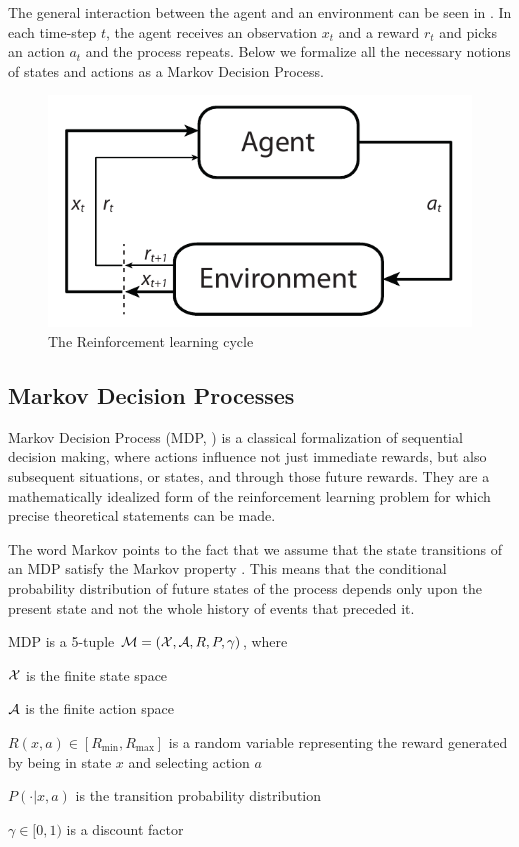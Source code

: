 The general interaction between the agent and an environment can be seen in . In each time-step $t$, the agent receives an observation $x_t$ and a reward $r_t$ and picks an action $a_t$ and the process repeats. Below we formalize all the necessary notions of states and actions as a Markov Decision Process.

\begin{figure}[h]
\center
\includegraphics[width=.6\linewidth]{gfx/rl_loop.pdf}
\caption{The Reinforcement learning cycle}
\label{fig:prelim:rlloop}
\end{figure}

\subsection{Markov Decision Processes}

Markov Decision Process (MDP, \citet{bellman1957markovian}) is a classical formalization of sequential decision making, where actions influence not just immediate rewards, but also subsequent situations, or states, and through those future rewards. They are a mathematically idealized form of the reinforcement learning problem for which precise theoretical statements can be made.

The word Markov points to the fact that we assume that the state transitions of an MDP satisfy the Markov property \cite{???}. This means that the conditional probability distribution of future states of the process depends only upon the present state and not the whole history of events that preceded it.

\begin{definition}

MDP is a 5-tuple $\mathcal{M} = (\mathcal{X}, \mathcal{A}, R, P, \gamma)$, where 

$\mathcal{X}$ is the finite state space

$\mathcal{A}$ is the finite action space

$R(x, a) \in [R_{\min}, R_{\max}]$ is a random variable representing the reward generated by being in state $x$ and selecting action $a$

$P(\cdot|x, a)$ is the transition probability distribution

$\gamma \in [0, 1)$ is a discount factor
\end{definition}

